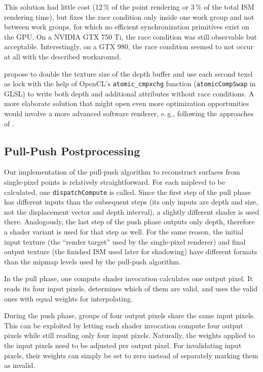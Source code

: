 This solution had little cost (12\,\% of the point rendering or 3\,\% of the total ISM rendering time), but fixes the race condition only inside one work group and not between work groups, for which no efficient synchronization primitives exist on the GPU. On a NVIDIA GTX 750 Ti, the race condition was still observable but acceptable. Interestingly, on a GTX 980, the race condition seemed to not occur at all with the described workaround.

\citet{Günther:2013:AcceleratedPointCloudRendering} propose to double the texture size of the depth buffer and use each second texel as lock with the help of OpenCL's \texttt{atomic\_cmpxchg} function (\texttt{atomicCompSwap} in GLSL) to write both depth and additional attributes without race conditions. A more elaborate solution that might open  even more optimization opportunities would involve a more advanced software renderer, e.\,g., following the approaches of \citet{Laine:2011:SoftwareRasterization}.


\subsection{Pull-Push Postprocessing}
\label{sec:impl:pullPushPostprocessing}

Our implementation of the pull-push algorithm to reconstruct surfaces from single-pixel points is relatively straightforward. For each miplevel to be calculated, one \texttt{dispatchCompute} is called. Since the first step of the pull phase has different inputs than the subsequent steps (its only inputs are depth and size, not the displacement vector and depth interval), a slightly different shader is used there. Analogously, the last step of the push phase outputs only depth, therefore a shader variant is used for that step as well. For the same reason, the initial input texture (the ``render target'' used by the single-pixel renderer) and final output texture (the finished ISM used later for shadowing) have different formats than the mipmap levels used by the pull-push algorithm.


In the pull phase, one compute shader invocation calculates one output pixel. It reads its four input pixels, determines which of them are valid, and uses the valid ones with equal weights for interpolating.


During the push phase, groups of four output pixels share the same input pixels. This can be exploited by letting each shader invocation compute four output pixels while still reading only four input pixels. Naturally, the weights applied to the input pixels need to be adjusted per output pixel. For invalidating input pixels, their weights can simply be set to zero instead of separately marking them as invalid.

